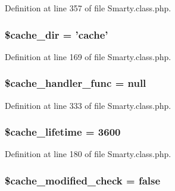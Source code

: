\-Definition at line 357 of file \-Smarty.\-class.\-php.

\hypertarget{class_smarty_a22a35efc9ca709527d49ff8bfe76db78}{
\subsubsection[{\$cache\-\_\-dir}]{\setlength{\rightskip}{0pt plus 5cm}\$cache\-\_\-dir = 'cache'}}\label{class_smarty_a22a35efc9ca709527d49ff8bfe76db78}


\-Definition at line 169 of file \-Smarty.\-class.\-php.

\hypertarget{class_smarty_a212fee0b84704db751e24b434177a478}{
\subsubsection[{\$cache\-\_\-handler\-\_\-func}]{\setlength{\rightskip}{0pt plus 5cm}\$cache\-\_\-handler\-\_\-func = null}}\label{class_smarty_a212fee0b84704db751e24b434177a478}


\-Definition at line 333 of file \-Smarty.\-class.\-php.

\hypertarget{class_smarty_a5aaab753f75170fa670cbb602aa97119}{
\subsubsection[{\$cache\-\_\-lifetime}]{\setlength{\rightskip}{0pt plus 5cm}\$cache\-\_\-lifetime = 3600}}\label{class_smarty_a5aaab753f75170fa670cbb602aa97119}


\-Definition at line 180 of file \-Smarty.\-class.\-php.

\hypertarget{class_smarty_a0734d0f7c5eea130baa18c0424ab07b0}{
\subsubsection[{\$cache\-\_\-modified\-\_\-check}]{\setlength{\rightskip}{0pt plus 5cm}\$cache\-\_\-modified\-\_\-check = false}}\label{class_smarty_a0734d0f7c5eea130baa18c0424ab07b0}


